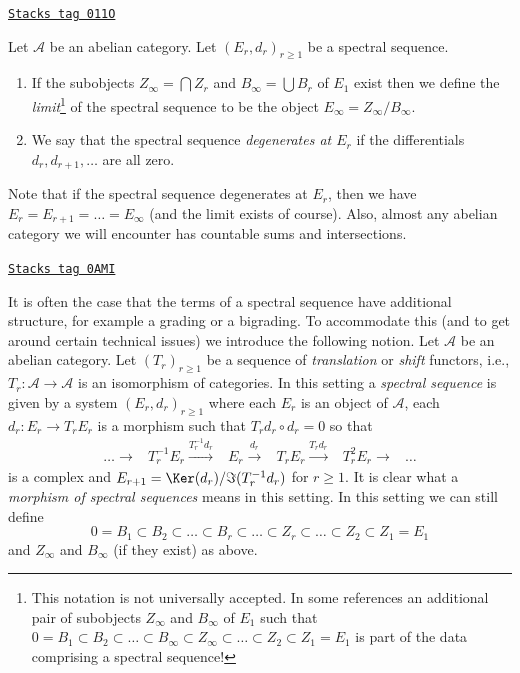 \begin{definition}
\label{homology-definition-limit-spectral-sequence}
\href{https://stacks.math.columbia.edu/tag/011O}{\texttt{Stacks tag 011O}}

Let $\mathcal{A}$ be an abelian category.
Let $(E_r, d_r)_{r \geq 1}$ be a spectral sequence.
\begin{enumerate}
\item If the subobjects $Z_{\infty} = \bigcap Z_r$
and $B_{\infty} = \bigcup B_r$ of $E_1$ exist then we define
the {\it limit}\footnote{This notation is not universally accepted. In some
references an additional pair of subobjects
$Z_\infty$ and $B_\infty$ of $E_1$ such that
$0 = B_1 \subset B_2 \subset \ldots \subset B_\infty \subset Z_\infty
\subset \ldots \subset Z_2 \subset Z_1 = E_1$
is part of the data comprising a spectral sequence!}
of the spectral sequence to be the object
$E_{\infty} = Z_{\infty}/B_{\infty}$.
\item We say that the spectral sequence {\it degenerates at $E_r$}
if the differentials $d_r, d_{r + 1}, \ldots$ are all zero.
\end{enumerate}
\end{definition}

Note that if the spectral sequence degenerates at $E_r$, then
we have $E_r = E_{r + 1} = \ldots = E_{\infty}$ (and the limit
exists of course). Also, almost any abelian category we will encounter
has countable sums and intersections.

\begin{remark}[Variant]

\label{homology-remark-allow-translation-functors}
\href{https://stacks.math.columbia.edu/tag/0AMI}{\texttt{Stacks tag 0AMI}}

It is often the case that the terms of a spectral sequence have
additional structure, for example a grading or a bigrading.
To accommodate this (and to get around certain technical issues)
we introduce the following notion. Let $\mathcal{A}$ be an
abelian category. Let $(T_r)_{r \geq 1}$ be a
sequence of {\it translation} or {\it shift} functors, i.e.,
$T_r : \mathcal{A} \to \mathcal{A}$ is an isomorphism of categories.
In this setting a {\it spectral sequence} is given by a system
$(E_r, d_r)_{r \geq 1}$ where each $E_r$ is an object of
$\mathcal{A}$, each $d_r : E_r \to T_rE_r$
is a morphism such that $T_rd_r \circ d_r = 0$ so that
$$
\begin{array}{cccccc}\ldots \longrightarrow & T_r^{-1}E_r \overset{T_r^{-1}d_r}{\longrightarrow} & E_r \overset{d_r}{\longrightarrow} & T_rE_r \overset{T_r d_r}{\longrightarrow} & T_r^2E_r \longrightarrow & \ldots\end{array}
$$
is a complex and $E_{r + 1} = \Ker(d_r)/\Im(T_r^{-1}d_r)$ for $r \geq 1$.
It is clear what a {\it morphism of spectral sequences}
means in this setting. In this setting we can still define
$$
0 = B_1 \subset B_2 \subset \ldots \subset B_r \subset \ldots
\subset Z_r \subset \ldots \subset Z_2 \subset Z_1 = E_1
$$
and $Z_\infty$ and $B_\infty$ (if they exist) as above.
\end{remark}

